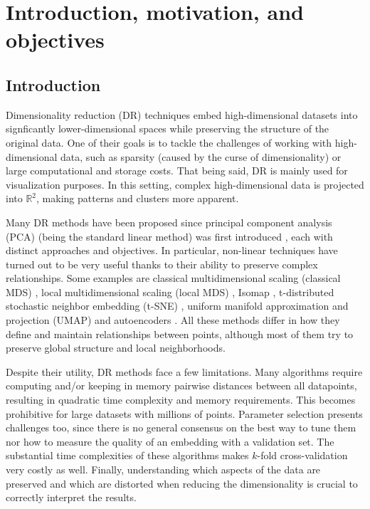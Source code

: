 \section{Introduction, motivation, and objectives}

\subsection{Introduction}

Dimensionality reduction (DR) techniques embed high-dimensional datasets into signficantly lower-dimensional spaces while preserving the structure of the original data. One of their goals is to tackle the challenges of working with high-dimensional data, such as sparsity (caused by the curse of dimensionality) or large computational and storage costs. That being said, DR is mainly used for visualization purposes. In this setting, complex high-dimensional data is projected into $\mathbb{R}^2$, making patterns and clusters more apparent.

Many DR methods have been proposed since principal component analysis (PCA) (being the standard linear method) was first introduced \citep{Pearson1901}, each with distinct approaches and objectives. In particular, non-linear techniques have turned out to be very useful thanks to their ability to preserve complex relationships. Some examples are classical multidimensional scaling (classical MDS) \citep{Torgerson1952, Gower1966}, local multidimensional scaling (local MDS) \citep{Chen2009}, Isomap \citep{Tenenbaum2000}, t-distributed stochastic neighbor embedding (t-SNE) \citep{Vandermaaten2008}, uniform manifold approximation and projection (UMAP) \citep{McInnes2018a} and autoencoders \citep{Baldi1989, Kramer1991}. All these methods differ in how they define and maintain relationships between points, although most of them try to preserve global structure and local neighborhoods.

Despite their utility, DR methods face a few limitations. Many algorithms require computing and/or keeping in memory pairwise distances between all datapoints, resulting in quadratic time complexity and memory requirements. This becomes prohibitive for large datasets with millions of points. Parameter selection presents challenges too, since there is no general consensus on the best way to tune them nor how to measure the quality of an embedding with a validation set. The substantial time complexities of these algorithms makes $k$-fold cross-validation very costly as well. Finally, understanding which aspects of the data are preserved and which are distorted when reducing the dimensionality is crucial to correctly interpret the results.

